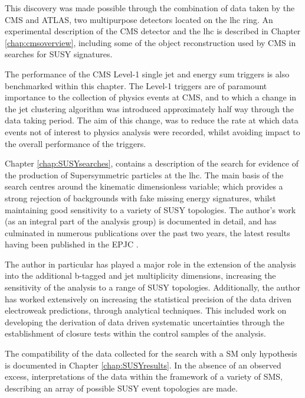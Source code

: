 This discovery was made possible through the combination of data taken by the \acf{CMS} and \ac{ATLAS}, two multipurpose detectors located on the \ac{lhc} ring. An experimental description of the \ac{CMS} detector and the \ac{lhc} is described in Chapter \ref{chap:cmsoverview}, including some of the object reconstruction used by \ac{CMS} in searches for \ac{SUSY} signatures. 

The performance of the \ac{CMS} Level-1 single jet and energy sum triggers is also benchmarked within this chapter. The Level-1 triggers are of paramount importance to the collection of physics events at \ac{CMS}, and to which a change in the jet clustering algorithm was introduced approximately half way through the data taking period. The aim of this change, was to reduce the rate at which data events not of interest to physics analysis were recorded, whilst avoiding impact to the overall performance of the triggers.

Chapter \ref{chap:SUSYsearches}, contains a description of the search for evidence of the production of Supersymmetric particles at the \ac{lhc}. The main basis of the search centres around the kinematic dimensionless \alphat variable; which provides a strong rejection of backgrounds with fake missing energy signatures, whilst maintaining good sensitivity to a variety of \ac{SUSY} topologies. The author's work (as an integral part of the analysis group) is documented in detail, and has culminated in numerous publications over the past two years, the latest results having been published in the \acf{EPJC} \cite{ra1_epjc}. 

The author in particular has played a major role in the extension of the \alphat analysis into the additional b-tagged and jet multiplicity dimensions, increasing the sensitivity of the analysis to a range of \ac{SUSY} topologies. Additionally, the author has worked extensively on increasing the statistical precision of the data driven electroweak predictions, through analytical techniques. This included work on developing the derivation of data driven systematic uncertainties through the establishment of closure tests within the control samples of the analysis. 

The compatibility of the data collected for the \alphat search with a \ac{SM} only hypothesis is documented in Chapter \ref{chap:SUSYresults}. In the absence of an observed excess, interpretations of the data within the framework of a variety of \acf{SMS}, describing an array of possible \ac{SUSY} event topologies are made.

